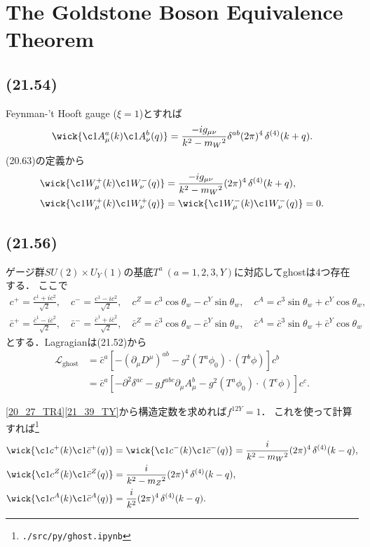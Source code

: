 \section{The Goldstone Boson Equivalence Theorem}
\subsection{(21.54)}
Feynman-'t Hooft gauge (\(\xi=1\))とすれば
\[
\wick{ \c1{A^a_\mu}(k) \c1{A^b_\nu}(q) } =  \frac{-ig_{\mu\nu}}{k^2-m_W{}^2} \delta^{ab} (2\pi)^4 \mathop{\delta^{(4)}}(k+q) .
\]
(20.63)の定義から
\begin{align*}
  \wick{ \c1{W^+_\mu}(k) \c1{W^-_\nu}(q) } &= \frac{-ig_{\mu\nu}}{k^2-m_W{}^2} (2\pi)^4 \mathop{\delta^{(4)}}(k+q) , \\
  \wick{ \c1{W^+_\mu}(k) \c1{W^+_\nu}(q) } &= \wick{ \c1{W^-_\mu}(k) \c1{W^-_\nu}(q) } = 0.
\end{align*}

\subsection{(21.56)}
ゲージ群\(SU(2)\times U_Y(1)\)の基底\(T^a~(a=1, 2, 3, Y)\)に対応してghostは4つ存在する．
ここで
\begin{gather*}
  c^+ = \frac{c^1+ic^2}{\sqrt{2}} , \quad c^- = \frac{c^1-ic^2}{\sqrt{2}} , \quad
  c^Z = c^3 \cos\theta_w - c^Y \sin\theta_w , \quad c^A = c^3 \sin\theta_w + c^Y \cos\theta_w , \\
  \bar{c}^+ = \frac{\bar{c}^1-i\bar{c}^2}{\sqrt{2}} , \quad \bar{c}^- = \frac{\bar{c}^1+i\bar{c}^2}{\sqrt{2}} , \quad
  \bar{c}^Z = \bar{c}^3 \cos\theta_w - \bar{c}^Y \sin\theta_w , \quad \bar{c}^A = \bar{c}^3 \sin\theta_w + \bar{c}^Y \cos\theta_w
\end{gather*}
とする．Lagragianは(21.52)から
\begin{align*}
  \mathcal{L}_\text{ghost}
  &= \bar{c}^a \left[ - (\partial_\mu D^\mu)^{ab} - g^2 (T^a\phi_0) \cdot (T^b\phi) \right] c^b \\
  &= \bar{c}^a \left[ - \partial^2 \delta^{ac} - g f^{abc} \partial_\mu A^b_\mu - g^2 (T^a\phi_0) \cdot (T^c\phi) \right] c^c .
\end{align*}

\eqref{20_27_TR4}\eqref{21_39_TY}から構造定数を求めれば\(f^{12Y} = 1\)．
これを使って計算すれば\footnote{\verb|./src/py/ghost.ipynb|}
\begin{align}
  \begin{split}
    \wick{ \c1{c^+}(k) \c1{\bar{c}^+}(q) } &= \wick{ \c1{c^-}(k) \c1{\bar{c}^-}(q) } = \frac{i}{k^2-m_W{}^2} (2\pi)^4 \mathop{\delta^{(4)}}(k-q) , \\
    \wick{ \c1{c^Z}(k) \c1{\bar{c}^Z}(q) } &= \frac{i}{k^2-m_Z{}^2} (2\pi)^4 \mathop{\delta^{(4)}}(k-q) , \\
    \wick{ \c1{c^A}(k) \c1{\bar{c}^A}(q) } &= \frac{i}{k^2} (2\pi)^4 \mathop{\delta^{(4)}}(k-q) .
  \end{split}
  \label{21_56_eigen_ghost_propagator}
\end{align}

